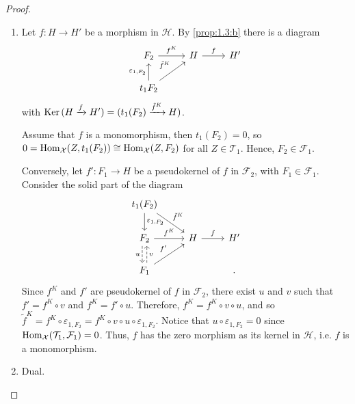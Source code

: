 \begin{proof}
  \begin{enumerate}[label=(\alph*)]
    \item Let $f:H\to H'$ be a morphism in $\mathcal{H}$. By \cref{prop:1.3:b} there is a diagram
    \begin{equation*}
      \begin{tikzcd}
        F_2\arrow{r}{f^K}
          & H\arrow{r}{f}
            & H'\\
        t_1{F_2}\arrow{u}{\varepsilon_{1,F_2}}\arrow{ur}{\tilde{f}^K}
      \end{tikzcd}
    \end{equation*}
    with $\mathrm{\textup{Ker\,}}(H\xrightarrow{f} H') = (t_1(F_2)\xrightarrow{\tilde{f}^K}H)$.

    Assume that $f$ is a monomorphism, then $t_1(F_2)=0$, so $0=\mathrm{Hom}_{\mathcal{X}}(Z,t_1(F_2))\cong
    \mathrm{Hom}_{\mathcal{X}}(Z,F_2)$ for all $Z\in\mathcal{T}_1$. Hence, $F_2\in\mathcal{F}_1$.

    Conversely, let $f':F_1\to H$ be a pseudokernel of $f$ in $\mathcal{F}_2$, with $F_1\in\mathcal{F}_1$. Consider the
    solid part of the diagram
    \begin{equation*}
      \begin{tikzcd}
        t_1(F_2)\arrow{d}{\varepsilon_{1,F_2}}\arrow{dr}{\tilde{f}^K}
        & &\\
      F_2\arrow[dashed,shift right]{d}[']{u}\arrow{r}{f^K}
        & H\arrow{r}{f}
          & H'\\
      F_1\arrow[dashed,shift right]{u}[']{v}\arrow{ur}{f'}
        & &.
      \end{tikzcd}
    \end{equation*}
    Since $f^K$ and $f'$ are pseudokernel of $f$ in $\mathcal{F}_2$, there exist $u$ and $v$ such
    that $f'=f^K\circ v$ and $f^K=f'\circ u$. Therefore, $f^K=f^K\circ v\circ u$, and so
    $\tilde{f}^K=f^K\circ\varepsilon_{1,F_2}=f^K\circ v\circ u\circ\varepsilon_{1,F_2}$. Notice
    that $u\circ \varepsilon_{1,F_2}=0$ since $\mathrm{Hom}_{\mathcal{X}}(\mathcal{T}_1,\mathcal{F}_1)=0$.
    Thus, $f$ has the zero morphism as its kernel in $\mathcal{H}$, i.e. $f$ is a monomorphism.
    \item Dual.
  \end{enumerate}
\end{proof}

